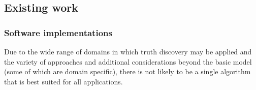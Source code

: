 \documentclass[../main.tex]{subfiles}
\begin{document}







\subsection{Existing work}
\subsubsection{Software implementations}

Due to the wide range of domains in which truth discovery may be applied and
the variety of approaches and additional considerations beyond the basic model
(some of which are domain specific), there is not likely to be a single
algorithm that is best suited for all applications.
\end{document}

